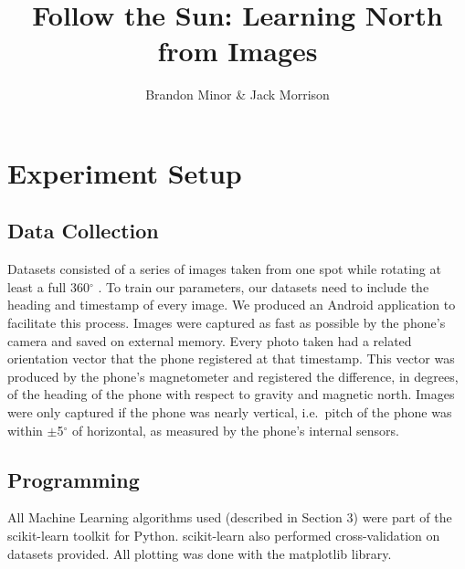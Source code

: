 \documentclass{article}
\begin{document}
\title{Follow the Sun: Learning North from Images}
\author{Brandon Minor \& Jack Morrison}
\maketitle


\newcommand{\degrees}{$^\circ$ }


\section{Experiment Setup}

\subsection{Data Collection}
Datasets consisted of a series of images taken from one spot while rotating at least a full 360\degrees.
To train our parameters, our datasets need to include the heading and timestamp of every image. We produced an Android application to facilitate this process. Images were captured as fast as possible by the phone's camera and saved on external memory. Every photo taken had a related orientation vector that the phone registered at that timestamp. This vector was produced by the phone's magnetometer and registered the difference, in degrees, of the heading of the phone with respect to gravity and magnetic north. Images were only captured if the phone was nearly vertical, i.e.\ pitch of the phone was within $\pm$5\degrees of horizontal, as measured by the phone's internal sensors.

\subsection{Programming}
All Machine Learning algorithms used (described in Section 3) were part of the scikit-learn toolkit for Python. scikit-learn also performed cross-validation on datasets provided. All plotting was done with the matplotlib library. 
\end{document}
